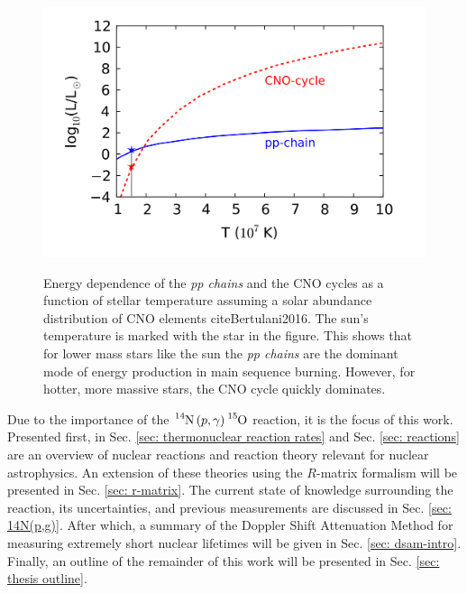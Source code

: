 \begin{figure}
\includegraphics[width=\linewidth]{figures/energyProduction.png}
\label{fig: CNO-energy}
\caption{Energy dependence of the \textit{pp chains} and the CNO cycles as a function of stellar temperature assuming a solar abundance distribution of CNO elements cite{Bertulani2016}. The sun's temperature is marked with the star in the figure. This shows that for lower mass stars like the sun the \textit{pp chains} are the dominant mode of energy production in main sequence burning. However, for hotter, more massive stars, the CNO cycle quickly dominates. }
\end{figure}



Due to the importance of the $\ce{^{14}N} \left( p, \gamma \right) \ce{^{15}O}$ reaction, it is the focus of this work. Presented first, in Sec. \ref{sec: thermonuclear reaction rates} and Sec. \ref{sec: reactions} are an overview of nuclear reactions and reaction theory relevant for nuclear astrophysics. An extension of these theories using the $R$-matrix formalism will be presented in Sec. \ref{sec: r-matrix}. The current state of knowledge surrounding the reaction, its uncertainties, and previous measurements are discussed in Sec. \ref{sec: 14N(p,g)}. After which, a summary of the Doppler Shift Attenuation Method for measuring extremely short nuclear lifetimes will be given in Sec. \ref{sec: dsam-intro}. Finally, an outline of the remainder of this work will be presented in Sec. \ref{sec: thesis outline}.


